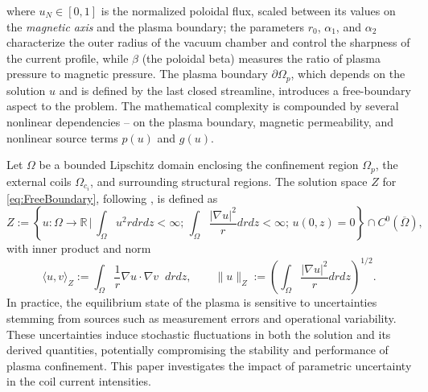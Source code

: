 %
where $u_N \in [0,1]$ is the normalized poloidal flux, scaled between its values on the \textit{magnetic axis} and the plasma boundary; the parameters $r_0$, $\alpha_1$, and $\alpha_2$ characterize the outer radius of the vacuum chamber and control the sharpness of the current profile, while $\beta$ (the poloidal beta) measures the ratio of plasma pressure to magnetic pressure. The plasma boundary $\partial \Omega_p$, which depends on the solution $u$ and is defined by the last closed streamline, introduces a free-boundary aspect to the problem. The mathematical complexity is compounded by several nonlinear dependencies -- on the plasma boundary, magnetic permeability, and nonlinear source terms $p(u)$ and $g(u)$.


Let $\Omega$ be a bounded Lipschitz domain enclosing the confinement region $\Omega_p$, the external coils $\Omega_{c_i}$, and surrounding structural regions.  The solution space $Z$ for \eqref{eq:FreeBoundary}, following \cite{Gr:1999}, is defined as
%
\begin{equation}\label{eq:Soln_space}
    Z:=\left\{u:\Omega\rightarrow \mathbb{R} \,\Bigg| \,\int_\Omega u^2rdrdz<\infty; \,  \int_\Omega\frac{|\nabla u|^2}{r}drdz<\infty; \, u(0,z)=0 \right\}\cap C^0(\overline{\Omega}),
\end{equation}
%
with inner product and norm
%
\[
    \langle u,v\rangle_Z := \int_{\Omega} \frac{1}{r} \nabla u\cdot\nabla v \;\;drdz,\qquad \| u \|_{Z} :=\left(\int_\Omega\frac{|\nabla u|^2}{r} drdz\right)^{1/2}.
\]
%
In practice, the equilibrium state of the plasma is sensitive to uncertainties stemming from sources such as measurement errors and operational variability. These uncertainties induce stochastic fluctuations in both the solution and its derived quantities, potentially compromising the stability and performance of plasma confinement. This paper investigates the impact of parametric uncertainty in the coil current intensities. 

